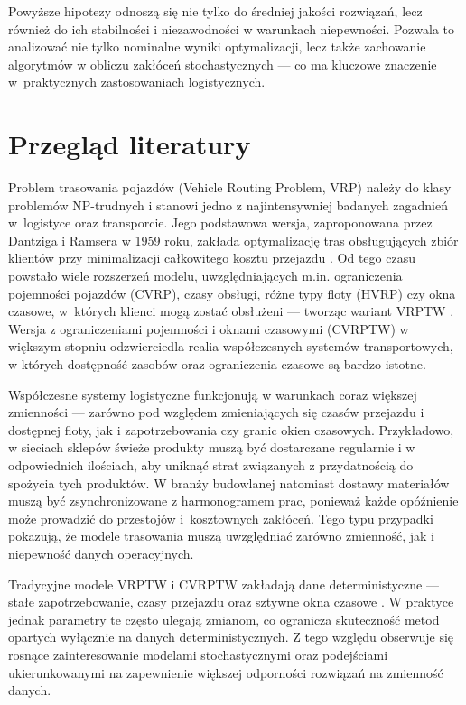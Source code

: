 Powyższe hipotezy odnoszą się nie tylko do średniej jakości rozwiązań, lecz również do ich stabilności i niezawodności w warunkach niepewności. Pozwala to analizować nie tylko nominalne wyniki optymalizacji, lecz także zachowanie algorytmów w obliczu zakłóceń stochastycznych — co ma kluczowe znaczenie w~praktycznych zastosowaniach logistycznych.


\section{Przegląd literatury}

Problem trasowania pojazdów (Vehicle Routing Problem, VRP) należy do klasy problemów NP-trudnych i stanowi jedno z najintensywniej badanych zagadnień w~logistyce oraz transporcie. Jego podstawowa wersja, zaproponowana przez Dantziga i Ramsera w 1959 roku, zakłada optymalizację tras obsługujących zbiór klientów przy minimalizacji całkowitego kosztu przejazdu \cite{Dantzig1959}. Od tego czasu powstało wiele rozszerzeń modelu, uwzględniających m.in. ograniczenia pojemności pojazdów (CVRP), czasy obsługi, różne typy floty (HVRP) czy okna czasowe, w~których klienci mogą zostać obsłużeni — tworząc wariant VRPTW \cite{Toth2014, Golden2008}. Wersja z ograniczeniami pojemności i oknami czasowymi (CVRPTW) w większym stopniu odzwierciedla realia współczesnych systemów transportowych, w których dostępność zasobów oraz ograniczenia czasowe są bardzo istotne.

Współczesne systemy logistyczne funkcjonują w warunkach coraz większej zmienności — zarówno pod względem zmieniających się czasów przejazdu i dostępnej floty, jak i zapotrzebowania czy granic okien czasowych. Przykładowo, w sieciach sklepów świeże produkty muszą być dostarczane regularnie i w odpowiednich ilościach, aby uniknąć strat związanych z przydatnością do spożycia tych produktów. W branży budowlanej natomiast dostawy materiałów muszą być zsynchronizowane z harmonogramem prac, ponieważ każde opóźnienie może prowadzić do przestojów i~kosztownych zakłóceń. Tego typu przypadki pokazują, że modele trasowania muszą uwzględniać zarówno zmienność, jak i niepewność danych operacyjnych.

Tradycyjne modele VRPTW i CVRPTW zakładają dane deterministyczne — stałe zapotrzebowanie, czasy przejazdu oraz sztywne okna czasowe \cite{surveyBraekers, RCVRPTWreviewYernar}. W praktyce jednak parametry te często ulegają zmianom, co ogranicza skuteczność metod opartych wyłącznie na danych deterministycznych. Z tego względu obserwuje się rosnące zainteresowanie modelami stochastycznymi oraz podejściami ukierunkowanymi na zapewnienie większej odporności rozwiązań na zmienność danych.

